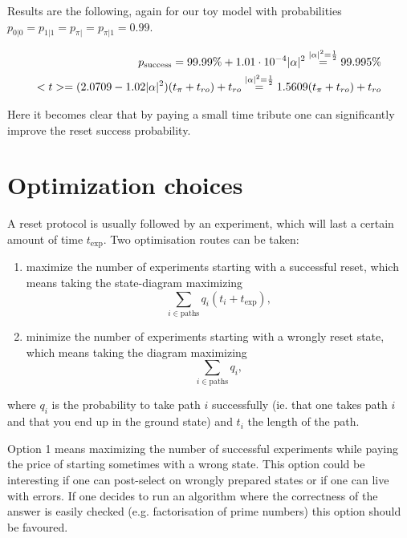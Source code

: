 Results are the following, again for our toy model with probabilities $p_{0|0} = p_{1|1} = p_{\pi|} = p_{\pi|1} = 0.99$. 

\begin{eqnarray}
p_\text{success} = 99.99\% + 1.01\cdot10^{-4} \lvert \alpha \rvert^2  \overset{\lvert \alpha \rvert^2 = \frac{1}{2}}{=} 99.995 \% \\
<t> = (2.0709 - 1.02 \lvert \alpha \rvert^2)(t_\pi + t_{ro}) + t_{ro} \overset{\lvert \alpha \rvert^2 = \frac{1}{2}}{=} 1.5609(t_\pi + t_{ro}) + t_{ro}
\end{eqnarray}

Here it becomes clear that by paying a small time tribute one can significantly improve the reset success probability.

\section{Optimization choices}

A reset protocol is usually followed by an experiment, which will last a certain amount of time $t_\mathrm{exp}$.
Two optimisation routes can be taken:
\begin{enumerate}
    \item maximize the number of experiments starting with a successful reset, which means taking the state-diagram maximizing
    \begin{equation}
        \sum_{i \in \mathrm{paths}} q_i(t_i + t_\mathrm{exp}), \label{eq:pathtime-optimizer}
    \end{equation}
    \item minimize the number of experiments starting with a wrongly reset state, which means taking the diagram maximizing
    \begin{equation}
        \sum_{i \in \mathrm{paths}}  q_i,
    \end{equation}
\end{enumerate} 

where $q_i$ is the probability to take path $i$ successfully (ie. that one takes path $i$ and that you end up in the ground state) and $t_i$ the length of the path. 

Option 1 means maximizing the number of successful experiments while paying the price of starting sometimes with a wrong state. This option could be interesting if one can post-select on wrongly prepared states or if one can live with errors. If one decides to run an algorithm where the correctness of the answer is easily checked (e.g. factorisation of prime numbers) this option should be favoured.

